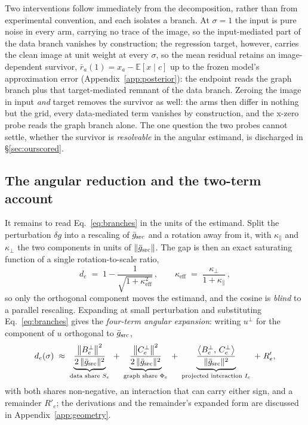 Two interventions follow immediately from the decomposition, rather
than from experimental convention, and each isolates a branch. At
$\sigma = 1$ the input is pure noise in every arm, carrying no trace
of the image, so the input-mediated part of the data branch vanishes
by construction; the regression target, however, carries the clean
image at unit weight at every $\sigma$, so the mean residual retains
an image-dependent survivor,
$\bar r_a(1) = x_a - \mathbb{E}[x \mid c]$ up to the frozen model's
approximation error (Appendix~\ref{app:posterior}): the endpoint
reads the graph branch plus that target-mediated remnant of the data
branch. Zeroing the image in input \emph{and} target removes the
survivor as well: the arms then differ in nothing but the grid, every
data-mediated term vanishes by construction, and the x-zero probe
reads the graph branch alone. The one question the two probes cannot
settle, whether the survivor is \emph{resolvable} in the angular
estimand, is discharged in \S\ref{sec:ourscored}.

\subsection{The angular reduction and the two-term account}
\label{sec:reduction}

It remains to read Eq.~\ref{eq:branches} in the units of the estimand.
Split the perturbation $\delta g$ into a rescaling of $\bar g_{\mathrm{src}}$
and a rotation away from it, with $\kappa_\parallel$ and
$\kappa_\perp$ the two components in units of $\|\bar g_{\mathrm{src}}\|$.
The gap is then an exact saturating function of a single
rotation-to-scale ratio,
\begin{equation}
d_e \;=\; 1 - \frac{1}{\sqrt{1 + \kappa_{\mathrm{eff}}^2}}\,,
\qquad
\kappa_{\mathrm{eff}} \;=\; \frac{\kappa_\perp}{1 + \kappa_\parallel}\,,
\label{eq:exact}
\end{equation}
so only the orthogonal component moves the estimand, and the cosine
is \emph{blind} to a parallel rescaling. Expanding at small perturbation
and substituting Eq.~\ref{eq:branches} gives the \emph{four-term
angular expansion}: writing $u^{\perp}$ for the component of $u$
orthogonal to $\bar g_{\mathrm{src}}$,
\begin{equation}
d_e(\sigma) \;\approx\;
\underbrace{\frac{\big\|B_e^{\perp}\big\|^2}{2\,\|\bar g_{\mathrm{src}}\|^2}}_{\text{data share }S_e}
\;+\;
\underbrace{\frac{\big\|C_e^{\perp}\big\|^2}{2\,\|\bar g_{\mathrm{src}}\|^2}}_{\text{graph share }\Phi_e}
\;+\;
\underbrace{\frac{\big\langle B_e^{\perp},\, C_e^{\perp}\big\rangle}{\|\bar g_{\mathrm{src}}\|^2}}_{\text{projected interaction }I_e}
\;+\; R'_e,
\label{eq:fourterm}
\end{equation}
with both shares non-negative, an interaction that can carry either
sign, and a
remainder $R'_e$; the derivations and the remainder's expanded form
are discussed in Appendix~\ref{app:geometry}.

